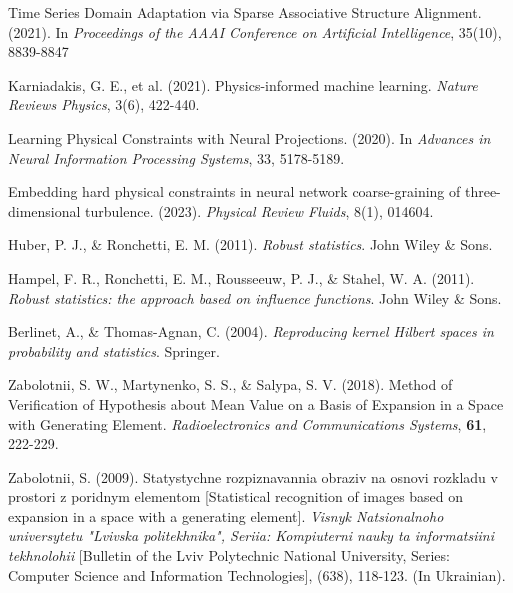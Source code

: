 \documentclass[12pt,a4paper]{article}
\begin{document}
\begin{thebibliography}{99}
		Time Series Domain Adaptation via Sparse Associative Structure Alignment. (2021). In \textit{Proceedings of the AAAI Conference on Artificial Intelligence}, 35(10), 8839-8847
		
		Karniadakis, G. E., et al. (2021). Physics-informed machine learning. \textit{Nature Reviews Physics}, 3(6), 422-440.
		
		Learning Physical Constraints with Neural Projections. (2020). In \textit{Advances in Neural Information Processing Systems}, 33, 5178-5189.
		
		Embedding hard physical constraints in neural network coarse-graining of three-dimensional turbulence. (2023). \textit{Physical Review Fluids}, 8(1), 014604.
		
		Huber, P. J., \& Ronchetti, E. M. (2011). \textit{Robust statistics}. John Wiley \& Sons.
		
		Hampel, F. R., Ronchetti, E. M., Rousseeuw, P. J., \& Stahel, W. A. (2011). \textit{Robust statistics: the approach based on influence functions}. John Wiley \& Sons.
		
		Berlinet, A., \& Thomas-Agnan, C. (2004). \textit{Reproducing kernel Hilbert spaces in probability and statistics}. Springer.
		
		Zabolotnii, S. W., Martynenko, S. S., \&  Salypa, S. V. (2018). Method of Verification of Hypothesis about Mean Value on a Basis of Expansion in a Space with Generating Element. \textit{Radioelectronics and Communications Systems}, \textbf{61}, 222-229.
		
		Zabolotnii, S. (2009). Statystychne rozpiznavannia obraziv na osnovi rozkladu v prostori z poridnym elementom [Statistical recognition of images based on expansion in a space with a generating element]. \textit{Visnyk Natsionalnoho universytetu "Lvivska politekhnika", Seriia: Kompiuterni nauky ta informatsiini tekhnolohii} [Bulletin of the Lviv Polytechnic National University, Series: Computer Science and Information Technologies], (638), 118-123. (In Ukrainian).
		

\end{thebibliography}
\end{document}
